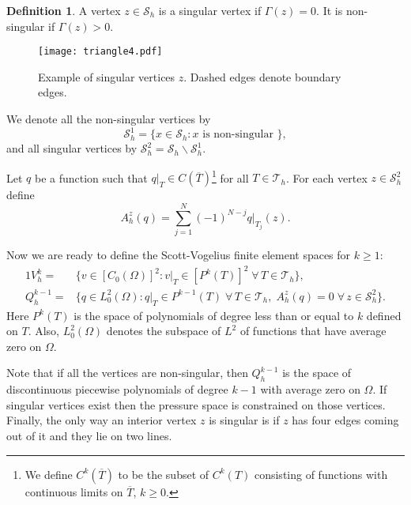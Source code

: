 \documentclass[11pt]{amsart}
\numberwithin{equation}{section}
\newcommand{\Forall}{\;\forall\,}
\newcommand{\Sh}{\mathcal{S}_h}
\newcommand{\ra}[1]{\renewcommand{\arraystretch}{#1}}
\newcommand{\Th}{\mathcal{T}_h}
\theoremstyle{definition}
\newtheorem{Def}{Definition}[section]
\begin{document}
\begin{Def}
A vertex $z \in \Sh$ is a singular vertex if $\Gamma(z)=0$. It is non-singular if $\Gamma(z) >0$.
\end{Def}




\begin{figure}
\centerline{\qquad\qquad\texttt{[image: triangle4.pdf]}}
\footnotesize
\ra{1.1}
\vspace{-40pt}
\caption{Example of singular vertices $z$. Dashed edges denote boundary edges.}
\label{triangle4}
\end{figure}


We denote all the non-singular vertices by
\begin{equation*}
\Sh^1=\{ x \in \Sh: x \text{ is non-singular } \},
\end{equation*}
and all singular vertices by $\Sh^2=\Sh \backslash \Sh^1$.


Let $q$ be a function such that $q|_T \in C(\overline{T})$\footnote{We define
$ C^k(\overline{T})$ to be the subset of $C^k(T)$ consisting of functions 
with continuous limits on $\overline{T}$, $k\ge 0$.} for all $T \in \Th$. 
For each vertex $z \in \Sh^2$ define
\begin{equation*}
A_h^z(q)= \sum_{j=1}^N (-1)^{N-j} q|_{T_j}(z).
\end{equation*}


Now we are ready to define the Scott-Vogelius finite element spaces for $k \ge 1$:
\begin{alignat*}{1}
V_h^k=&\{v \in [C_0(\Omega)]^2: v|_T \in [P^k(T)]^2 \Forall T \in \Th\}, \\
Q_h^{k-1}=& \{ q \in L_0^2(\Omega): q|_T \in P^{k-1}(T) \Forall T \in \Th,\; A_h^z(q)=0 
\Forall  z  \in \Sh^2\}. 
\end{alignat*}
Here $P^k(T)$ is the space of polynomials of degree less than or equal to $k$ defined on $T$. Also, $L_0^2(\Omega)$ denotes the subspace of $L^2$ of functions that have average zero on $\Omega$.

Note that if all the vertices are non-singular, then $Q_h^{k-1}$ is the space of 
discontinuous piecewise polynomials of degree $k-1$ with average zero on $\Omega$. If singular vertices exist  then the pressure space is constrained on those vertices.  
Finally, the only way an interior vertex $z$ is singular is if $z$ has four edges coming out of it and they lie on two lines. 
\end{document}
